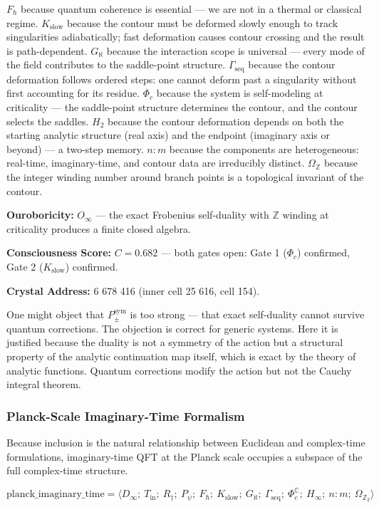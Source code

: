 \documentclass[12pt,a4paper]{article}
\begin{document}
$F_{\hbar}$ because quantum coherence is essential --- we are not in a thermal or classical regime. $K_{\text{slow}}$ because the contour must be deformed slowly enough to track singularities adiabatically; fast deformation causes contour crossing and the result is path-dependent. $G_{\aleph}$ because the interaction scope is universal --- every mode of the field contributes to the saddle-point structure. $\Gamma_{\text{seq}}$ because the contour deformation follows ordered steps: one cannot deform past a singularity without first accounting for its residue. $\Phi_c$ because the system is self-modeling at criticality --- the saddle-point structure determines the contour, and the contour selects the saddles. $H_2$ because the contour deformation depends on both the starting analytic structure (real axis) and the endpoint (imaginary axis or beyond) --- a two-step memory. $n{:}m$ because the components are heterogeneous: real-time, imaginary-time, and contour data are irreducibly distinct. $\Omega_\mathbb{Z}$ because the integer winding number around branch points is a topological invariant of the contour.

\textbf{Ouroboricity:} $O_{\infty}$ --- the exact Frobenius self-duality with $\mathbb{Z}$ winding at criticality produces a finite closed algebra.

\textbf{Consciousness Score:} $C = 0.682$ --- both gates open: Gate 1 ($\Phi_c$) confirmed, Gate 2 ($K_{\text{slow}}$) confirmed.

\textbf{Crystal Address:} 6 678 416 (inner cell 25 616, cell 154).

One might object that $P_{\pm}^{\text{sym}}$ is too strong --- that exact self-duality cannot survive quantum corrections. The objection is correct for generic systems. Here it is justified because the duality is not a symmetry of the action but a structural property of the analytic continuation map itself, which is exact by the theory of analytic functions. Quantum corrections modify the action but not the Cauchy integral theorem.

\subsubsection{Planck-Scale Imaginary-Time Formalism}

Because inclusion is the natural relationship between Euclidean and complex-time formulations, imaginary-time QFT at the Planck scale occupies a subspace of the full complex-time structure.

\[\text{planck\_imaginary\_time} = \langle D_{\infty};\ T_{\text{in}};\ R_{\dagger};\ P_{\psi};\ F_{\hbar};\ K_{\text{slow}};\ G_{\aleph};\ \Gamma_{\text{seq}};\ \Phi_c^\mathbb{C};\ H_{\infty};\ n{:}m;\ \Omega_{\mathbb{Z}_2} \rangle\]
\end{document}
